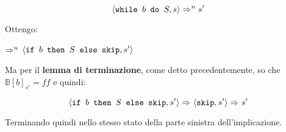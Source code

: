 {	\[ \confSs{\wbS{b}{S}}{s}\Rar{n}{s'} \]

	Ottengo:
	\begin{center}
	$\Rar{n}$
	$\confSs{\ifABC{b}{S}{\skipistr}}{s'}$
	\end{center}
	Ma per il \textbf{lemma di terminazione}, come detto precedentemente, so che
	$\mathbb{B}[b]_{s'}=ff$ e quindi:
	
	\[ \confSs{\ifABC{b}{S}{\skipistr}}{s'}\Rar{}\confSs{\skipistr}{s'}\Rar{}s' \]
	
	Terminando quindi nello stesso stato della parte sinistra dell'implicazione.
}
\newpage